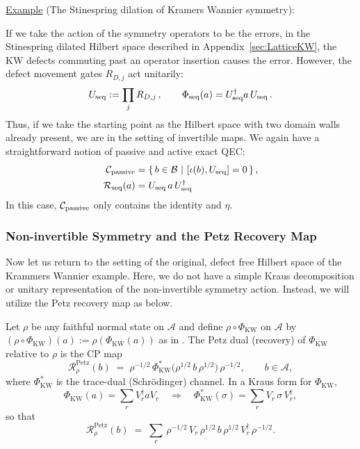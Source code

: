 \documentclass{article}
\newcommand{\mA}{\mathcal{A}}
\newcommand{\mB}{\mathcal{B}}
\theoremstyle{definition}
\begin{document}
  \underline{Example} (The Stinespring dilation of Kramers Wannier symmetry):

  If we take the action of the symmetry operators to be the errors, in the Stinespring
  dilated Hilbert space described in Appendix~\ref{sec:LatticeKW}, the KW
  defects commuting past an operator insertion causes the error. However, the
  defect movement gates $R_{D,j}$ act unitarily:
  \begin{equation}
    U_{\rm seq}:=\prod_{j}R_{D,j}\,,\qquad \Phi_{\rm seq}(a)=U_{\rm seq}^{\dagger}
    a\,U_{\rm seq}\,.
  \end{equation}
  Thus, if we take the starting point as the Hilbert space with two domain walls
  already present, we are in the setting of invertible maps. We again have a
  straightforward notion of passive and active exact QEC:
  \begin{align}
    \mathcal{C}_{\rm passive} & =\{\,b\in\mB~|~[\iota(b),U_{\rm seq}]=0\,\}\,, \\
    \mathcal{R}_{\rm seq}(a)  & =U_{\rm seq}\,a\,U_{\rm seq}^{\dagger}
  \end{align}
  In this case, $\mathcal{C}_{\rm passive}$ only contains the identity and
  $\eta$.

  \subsubsection{Non-invertible Symmetry and the Petz Recovery Map}

  Now let us return to the setting of the original, defect free Hilbert space of
  the Krammers Wannier example. Here, we do not have a simple Kraus
  decomposition or unitary representation of the non-invertible symmetry action.
  Instead, we will utilize the Petz recovery map as below.

  Let $\rho$ be any faithful normal state on $\mA$ and define
  $\rho\circ\Phi_{\text{KW}}$ on $\mA$ by
  $(\rho\circ\Phi_{\text{KW}})(a):=\rho(\Phi_{\text{KW}}(a))$ as in
  \cite[Thm.\,1; App.\,B.4]{furuya2022real}. The Petz dual (recovery) of $\Phi_{\text{KW}}$
  relative to $\rho$ is the CP map
  \begin{equation}
    \label{eq:Petz-Heis}\mathcal{R}^{\text{Petz}}_{\rho}(b) \;=\; \rho^{-1/2}\,\Phi
    _{\text{KW}}^{*}\!\big(\rho^{1/2}\,b\,\rho^{1/2}\big)\,\rho^{-1/2}, \qquad b\in
    \mA,
  \end{equation}
  where $\Phi_{\text{KW}}^{*}$ is the trace-dual (Schrödinger) channel. In a
  Kraus form for $\Phi_{\text{KW}}$,
  \begin{equation}
    \Phi_{\text{KW}}(a)=\sum_{r}V_{r}^{\dagger}a V_{r}\quad\Longrightarrow\quad \Phi
    _{\text{KW}}^{*}(\sigma)=\sum_{r}V_{r}\,\sigma\,V_{r}^{\dagger},
  \end{equation}
  so that
  \begin{equation}
    \label{eq:Petz-Kraus}\mathcal{R}^{\text{Petz}}_{\rho}(b) \;=\; \sum_{r}\, \rho
    ^{-1/2}\,V_{r}\,\rho^{1/2}\,b\,\rho^{1/2}\,V_{r}^{\dagger}\,\rho^{-1/2}.
  \end{equation}
\end{document}
